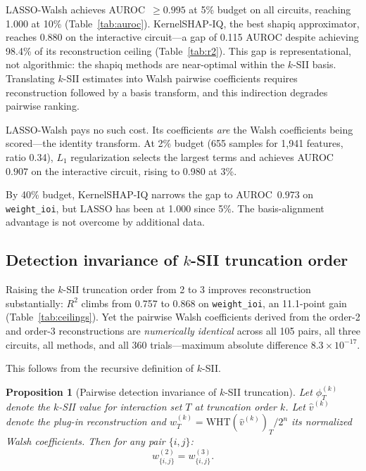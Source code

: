 \documentclass[10pt]{article}
\newtheorem{proposition}{Proposition}
\begin{document}
LASSO-Walsh achieves AUROC~$\geq 0.995$ at 5\% budget on all
circuits, reaching 1.000 at 10\% (Table~\ref{tab:auroc}).
KernelSHAP-IQ, the best shapiq approximator, reaches 0.880 on the
interactive circuit---a gap of 0.115 AUROC despite achieving 98.4\%
of its reconstruction ceiling (Table~\ref{tab:r2}). This gap is
representational, not algorithmic: the shapiq methods are
near-optimal within the $k$-SII basis. Translating $k$-SII estimates
into Walsh pairwise coefficients requires reconstruction followed by
a basis transform, and this indirection degrades pairwise ranking.

LASSO-Walsh pays no such cost. Its coefficients \emph{are} the Walsh
coefficients being scored---the identity transform. At 2\% budget
(655 samples for 1{,}941 features, ratio 0.34), $L_1$ regularization
selects the largest terms and achieves AUROC~$0.907$ on the
interactive circuit, rising to 0.980 at 3\%.

By 40\% budget, KernelSHAP-IQ narrows the gap to AUROC~$0.973$
on \texttt{weight\_ioi}, but LASSO has been at 1.000 since 5\%.
The basis-alignment advantage is not overcome by additional data.


\subsection{Detection invariance of $k$-SII truncation order}
\label{sec:invariance}

Raising the $k$-SII truncation order from 2 to 3 improves
reconstruction substantially: $R^2$ climbs from 0.757 to 0.868 on
\texttt{weight\_ioi}, an 11.1-point gain (Table~\ref{tab:ceilings}).
Yet the pairwise Walsh coefficients derived from the order-2 and
order-3 reconstructions are \emph{numerically identical} across all
105 pairs, all three circuits, all methods, and all 360
trials---maximum absolute difference $8.3 \times 10^{-17}$.

This follows from the recursive definition of $k$-SII.

\begin{proposition}[Pairwise detection invariance of $k$-SII truncation]
\label{prop:invariance}
Let $\phi^{(k)}_T$ denote the $k$-SII value for interaction set $T$
at truncation order $k$. Let $\hat{v}^{(k)}$ denote the plug-in
reconstruction and $w^{(k)}_T = \text{WHT}(\hat{v}^{(k)})_T / 2^n$
its normalized Walsh coefficients. Then for any pair $\{i,j\}$:
\[
  w^{(2)}_{\{i,j\}} = w^{(3)}_{\{i,j\}}.
\]
\end{proposition}
\end{document}
